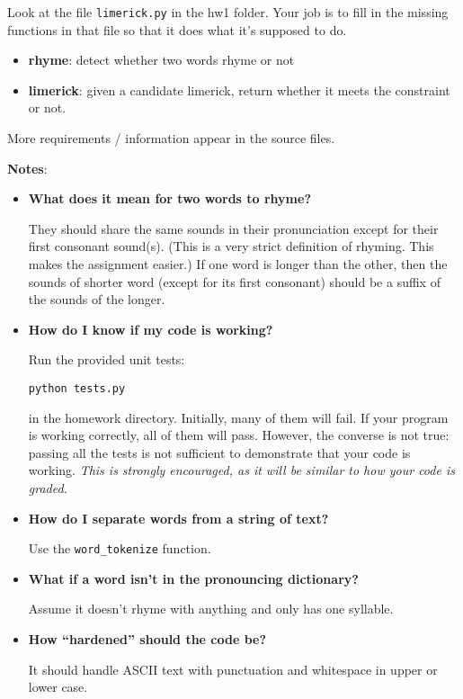 \documentclass[11pt]{article}
\begin{document}
Look at the file \texttt{limerick.py} in the hw1 folder.  Your job is to fill
in the missing functions in that file so that it does what it’s
supposed to do.
\begin{itemize}
\item {\bf rhyme}: detect whether two words rhyme or not
\item {\bf limerick}: given a candidate limerick, return whether it meets the
constraint or not.
\end{itemize}
More requirements / information appear in the source files.

\clearpage

\noindent \textbf{Notes}:
\begin{itemize}
\item {\bf What does it mean for two words to rhyme?}

They should share the same sounds in their pronunciation except for their first consonant sound(s).  (This is a very strict definition of rhyming.  This makes the assignment easier.)  If one word is longer than the other, then the sounds of shorter word (except for its first consonant) should be a suffix of the sounds of the longer.

\item {\bf How do I know if my code is working?}

Run the provided unit tests:

\texttt{python tests.py}

in the homework directory.  Initially, many of them will fail.  If your program is working correctly, all of them will pass.  However, the converse is not true: passing all the tests is not sufficient to demonstrate that your code is working.  \emph{This is strongly encouraged, as it will be similar to how your code is graded.}

\item {\bf How do I separate words from a string of text?}

Use the \texttt{word\_tokenize} function.

\item {\bf What if a word isn’t in the pronouncing dictionary?}

Assume it doesn’t rhyme with anything and only has one syllable.

\item {\bf How ``hardened'' should the code be?}

It should handle ASCII text with punctuation and whitespace in upper or lower case.


\end{itemize}
\end{document}
